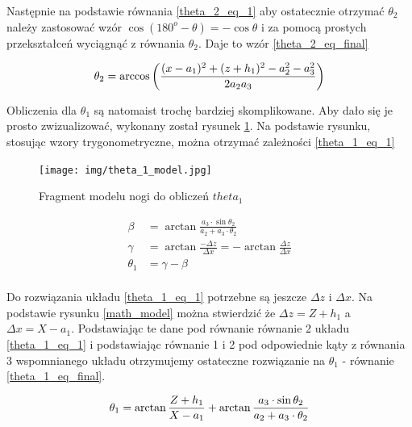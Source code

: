 Następnie na podstawie równania \ref{theta_2_eq_1} aby ostatecznie otrzymać $\theta_2$ należy zastosować wzór $\cos{(180^o - \theta)} = -\cos{\theta}$ i za pomocą prostych przekształceń wyciągnąć z równania $\theta_2$. Daje to wzór \ref{theta_2_eq_final} \cite{SCARA_model_calc}

\begin{equation} \label{theta_2_eq_final}
\theta_2 = \arccos{\left( \frac{(x - a_1)^2 + (z + h_1)^2 - a_2^2 - a_3^2}{2 a_2 a_3} \right)}\\ 
\end{equation} 

Obliczenia dla $\theta_1$ są natomaist trochę bardziej skomplikowane. Aby dało się je prosto zwizualizować, wykonany został rysunek \ref{theta_1_model}. Na podstawie rysunku, stosując wzory trygonometryczne, można otrzymać zależności \ref{theta_1_eq_1} \cite{SCARA_model_calc}

\begin{figure}[h!]
\texttt{[image: img/theta\_1\_model.jpg]}
\caption{Fragment modelu nogi do obliczeń $theta_1$}
\label{theta_1_model}
\end{figure}

\begin{equation}\label{theta_1_eq_1}
\begin{split}
\beta &= \arctan{\frac{a_3 \cdot \sin{\theta_2}}{a_2 + a_3 \cdot{\theta_2}}}\\
\gamma &= \arctan{\frac{-\Delta z}{\Delta x}} = - \arctan{\frac{\Delta z}{\Delta x}}\\
\theta_1 &= \gamma - \beta\\
\end{split}
\end{equation}

Do rozwiązania układu \ref{theta_1_eq_1} potrzebne są jeszcze $\Delta z$ i $\Delta x$. Na podstawie rysunku \ref{math_model} można stwierdzić że $\Delta z = Z + h_1$ a $\Delta x = X - a_1$. Podstawiając te dane pod równanie równanie 2 układu \ref{theta_1_eq_1} i podstawiając równanie 1 i 2 pod odpowiednie kąty z równania 3 wspomnianego układu otrzymujemy ostateczne rozwiązanie na $\theta_1$ - równanie \ref{theta_1_eq_final}.

\begin{equation}\label{theta_1_eq_final}
\theta_1 = \arctan{\frac{Z + h_1}{X - a_1}} + \arctan{\frac{a_3 \cdot \sin{\theta_2}}{a_2 + a_3 \cdot{\theta_2}}}\\ 
\end{equation}

